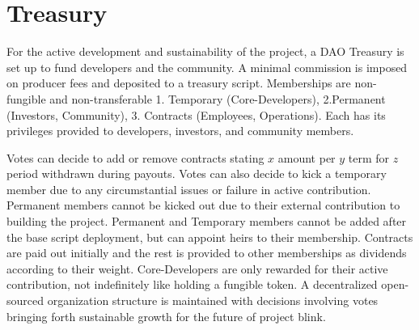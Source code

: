\documentclass[../Bitcoin Blink.tex]{subfiles}
\begin{document}
\section{Treasury}
For the active development and sustainability of the project, a DAO Treasury is set up to fund developers and the community. A minimal commission is imposed on producer fees and deposited to a treasury script. Memberships are non-fungible and non-transferable 1. Temporary (Core-Developers), 2.Permanent (Investors, Community), 3. Contracts (Employees, Operations). Each has its privileges provided to developers, investors, and community members. 

Votes can decide to add or remove contracts stating $x$ amount per $y$ term for $z$ period withdrawn during payouts. Votes can also decide to kick a temporary member due to any circumstantial issues or failure in active contribution. Permanent members cannot be kicked out due to their external contribution to building the project. Permanent and Temporary members cannot be added after the base script deployment, but can appoint heirs to their membership. Contracts are paid out initially and the rest is provided to other memberships as dividends according to their weight. Core-Developers are only rewarded for their active contribution, not indefinitely like holding a fungible token. A decentralized open-sourced organization structure is maintained with decisions involving votes bringing forth sustainable growth for the future of project blink.
\end{document}
